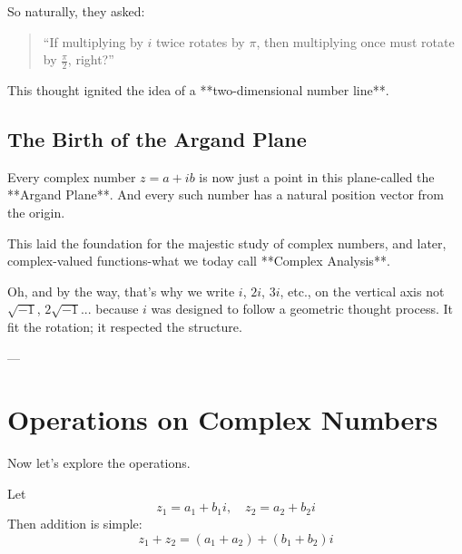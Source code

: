 So naturally, they asked:

\begin{quote}
“If multiplying by $i$ twice rotates by $\pi$, then multiplying once must rotate by $\frac{\pi}{2}$, right?”
\end{quote}

This thought ignited the idea of a **two-dimensional number line**.

\subsection*{The Birth of the Argand Plane}

\begin{center}
\end{center}

Every complex number $z = a + ib$ is now just a point in this plane-called the **Argand Plane**. And every such number has a natural position vector from the origin.

This laid the foundation for the majestic study of complex numbers, and later, complex-valued functions-what we today call **Complex Analysis**.

Oh, and by the way, that’s why we write $i$, $2i$, $3i$, etc., on the vertical axis not $\sqrt{-1}$, $2\sqrt{-1}$... because $i$ was designed to follow a geometric thought process. It fit the rotation; it respected the structure.

---

\section{Operations on Complex Numbers}

Now let’s explore the operations.

Let
\[
z_1 = a_1 + b_1 i, \quad z_2 = a_2 + b_2 i
\]
Then addition is simple:
\[
z_1 + z_2 = (a_1 + a_2) + (b_1 + b_2)i
\]

